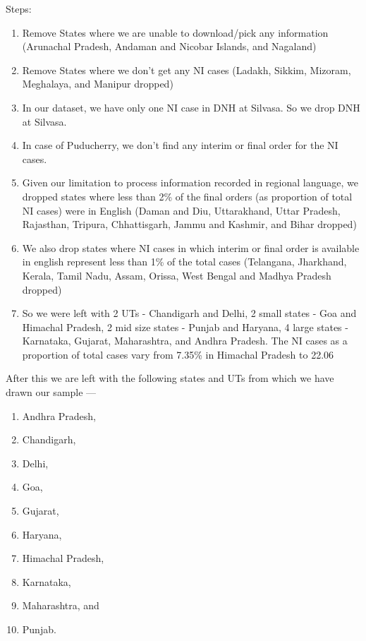 Steps: 
\begin{enumerate}
\item Remove States where we are unable to download/pick any information (Arunachal Pradesh, Andaman and Nicobar Islands, and Nagaland)
\item Remove States where we don't get any NI cases (Ladakh, Sikkim, Mizoram, Meghalaya, and Manipur dropped)
\item In our dataset, we have only one NI case in DNH at Silvasa. So we drop DNH at Silvasa.
\item In case of Puducherry, we don't find any interim or final order for the NI cases.
\item Given our limitation to process information recorded in regional language, we dropped states where less than 2\% of the final orders (as proportion of total NI cases) were in English (Daman and Diu, Uttarakhand, Uttar Pradesh, Rajasthan, Tripura, Chhattisgarh, Jammu and Kashmir, and Bihar dropped)
\item We also drop states where NI cases in which interim or final order is available in english represent less than 1\% of the total cases (Telangana, Jharkhand, Kerala, Tamil Nadu, Assam, Orissa, West Bengal and Madhya Pradesh dropped)
\item So we were left with 2 UTs - Chandigarh and Delhi, 2 small states - Goa and Himachal Pradesh, 2 mid size states - Punjab and Haryana, 4 large states - Karnataka, Gujarat, Maharashtra, and Andhra Pradesh. The NI cases as a proportion of total cases vary from 7.35\% in Himachal Pradesh to 22.06%
\end{enumerate}

After this we are left with the following states and UTs from which we have drawn our sample ---
\begin{enumerate}
\item Andhra Pradesh, 
\item Chandigarh, 
\item Delhi, 
\item Goa, 
\item Gujarat, 
\item Haryana,
\item Himachal Pradesh, 
\item Karnataka, 
\item Maharashtra, and 
\item Punjab.
\end{enumerate}

